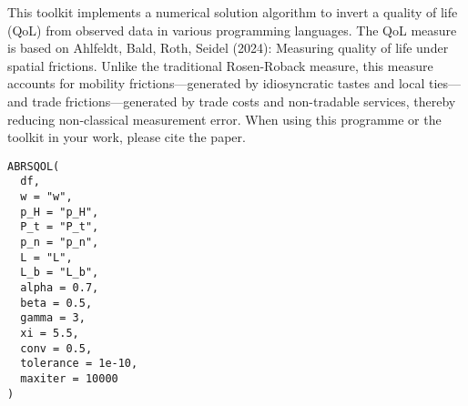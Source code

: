 \documentclass[a4paper]{book}
\begin{document}
%
\begin{Description}
This toolkit implements a numerical solution algorithm
to invert a quality of life (QoL) from observed data
in various programming languages. The QoL measure is
based on Ahlfeldt, Bald, Roth, Seidel (2024):
Measuring quality of life under spatial frictions.
Unlike the traditional Rosen-Roback measure, this measure
accounts for mobility frictions—generated by idiosyncratic
tastes and local ties—and trade frictions—generated by
trade costs and non-tradable services, thereby reducing
non-classical measurement error.
When using this programme or the toolkit in your work, please cite the paper.
\end{Description}
%
\begin{Usage}
\begin{verbatim}
ABRSQOL(
  df,
  w = "w",
  p_H = "p_H",
  P_t = "P_t",
  p_n = "p_n",
  L = "L",
  L_b = "L_b",
  alpha = 0.7,
  beta = 0.5,
  gamma = 3,
  xi = 5.5,
  conv = 0.5,
  tolerance = 1e-10,
  maxiter = 10000
)
\end{verbatim}
\end{Usage}
%
\end{document}
